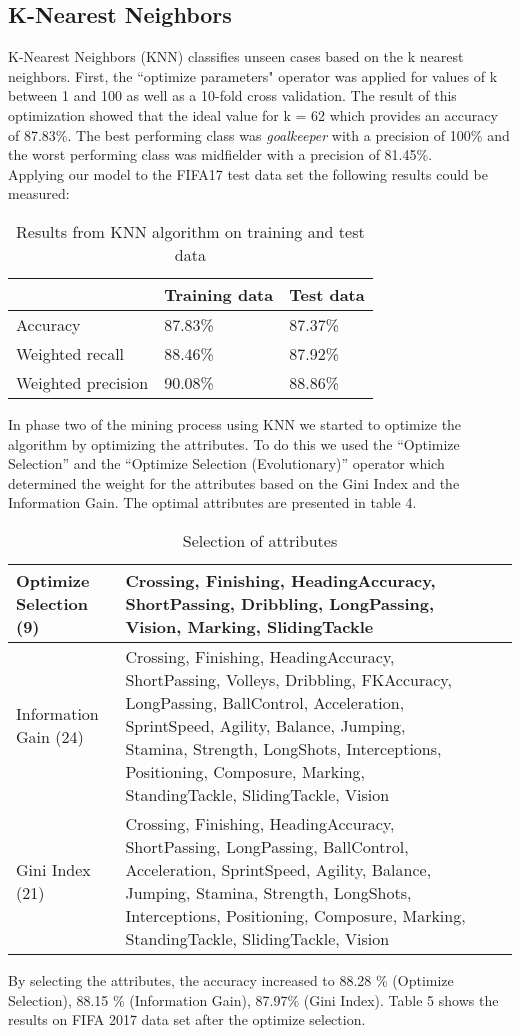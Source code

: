 
\subsection{K-Nearest Neighbors}
\label{sec:KNN}
K-Nearest Neighbors (KNN) classifies unseen cases based on the k nearest neighbors. 
First, the ``optimize parameters" operator was applied for values of k between 1 and 100 as well as a 10-fold cross validation. The result of this optimization showed that the ideal value for k = 62 which provides an accuracy of 87.83\%. The best performing class was \textit{goalkeeper} with a precision of 100\% and the worst performing class was midfielder with a precision of 81.45\%. \\
Applying our model to the FIFA17 test data set the following results could be measured:\\
\begin{table}[H]
\label{Tab:knn}
\centering
\begin{tabular}{@{}lll@{}}
\toprule
                   & Training data & Test data \\ \midrule
Accuracy           & 87.83\%       & 87.37\%   \\
Weighted recall    & 88.46\%       & 87.92\%   \\
Weighted precision & 90.08\%       & 88.86\%   \\ \bottomrule
\end{tabular}
\caption{Results from KNN algorithm on training and test data}
\end{table}
In phase two of the mining process using KNN we started to optimize the algorithm by optimizing the attributes.
To do this we used the ``Optimize Selection'' and the ``Optimize Selection (Evolutionary)'' operator which determined the weight for the attributes based on the Gini Index and the Information Gain.
The optimal attributes are presented in table 4.
\begin{table}[H]
\begin{tabular}{p{3.5cm}|p{7.5cm}l|l}
\hline 
Optimize Selection (9) & Crossing, Finishing, HeadingAccuracy, ShortPassing, Dribbling, LongPassing, Vision, Marking, SlidingTackle\\
\hline
Information Gain (24)& Crossing, Finishing, HeadingAccuracy, ShortPassing, Volleys, Dribbling, FKAccuracy, LongPassing, BallControl, Acceleration, SprintSpeed, Agility, Balance, Jumping, Stamina, Strength, LongShots, Interceptions, Positioning, Composure, Marking, StandingTackle, SlidingTackle, Vision \\
\hline 
Gini Index (21) & Crossing, Finishing, HeadingAccuracy, ShortPassing, LongPassing, BallControl, Acceleration, SprintSpeed, Agility, Balance, Jumping, Stamina, Strength, LongShots, Interceptions, Positioning, Composure, Marking, StandingTackle, SlidingTackle, Vision\\ \hline
\end{tabular}
\label{Tab:knn2}
\caption{Selection of attributes}
\end{table}	
By selecting the attributes, the accuracy increased to 88.28 \% (Optimize Selection), 88.15 \% (Information Gain), 87.97\% (Gini Index). Table 5 shows the results on FIFA 2017 data set after the optimize selection.

